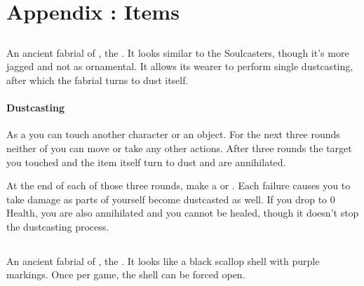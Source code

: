 \chapter{Appendix \thechapter{}: Items}
\label{chap:items}

\section{\lootDustcaster{}}

An ancient fabrial of \npcDustmother{}, the \npcDustmotherTitle{}. It looks similar to the Soulcasters, though it's more jagged and not as ornamental. It allows its wearer to perform single dustcasting, after which the fabrial turns to dust itself.

\subsubsection{Dustcasting}

As a \iconActionDouble{} you can touch another character or an object. For the next three rounds neither of you can move or take any other actions. After three rounds the target you touched and the item itself turn to dust and are annihilated. 

At the end of each of those three rounds, make a  or . Each failure causes you to take damage as parts of yourself become dustcasted as well. If you drop to 0 Health, you are also annihilated and you cannot be healed, though it doesn't stop the dustcasting process.







\newpage
\section{\lootGateOpener{}}

An ancient fabrial of \npcBlackFisher{}, the \npcBlackFisherTitle{}. It looks like a black scallop shell with purple markings. Once per game, the shell can be forced open.

